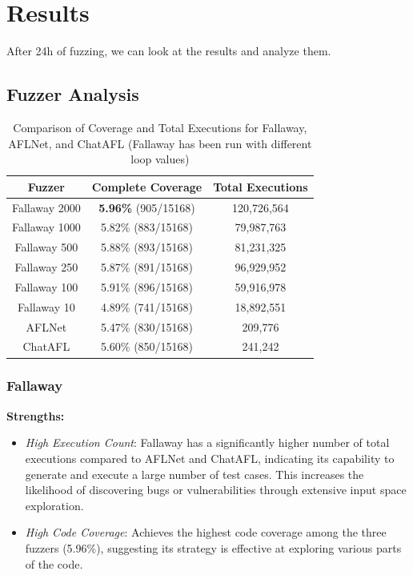 \chapter{Results}
\label{chap:Results}
After 24h of fuzzing, we can look at the results and analyze them.
\section{Fuzzer Analysis}

\begin{table}[H]
    \centering
    \begin{tabular}{|c|c|c|}
    \hline
    \textbf{Fuzzer} & \textbf{Complete Coverage} & \textbf{Total Executions} \\
    \hline
    Fallaway 2000 & \textbf{5.96\%} (905/15168) & 120,726,564 \\
    \hline
    Fallaway 1000 & 5.82\% (883/15168) & 79,987,763 \\
    \hline
    Fallaway 500 & 5.88\% (893/15168) & 81,231,325 \\
    \hline
    Fallaway 250 & 5.87\% (891/15168) & 96,929,952 \\
    \hline
    Fallaway 100 & 5.91\% (896/15168) & 59,916,978 \\
    \hline
    Fallaway 10 & 4.89\% (741/15168) & 18,892,551 \\
    \hline
    AFLNet & 5.47\% (830/15168) & 209,776 \\
    \hline
    ChatAFL & 5.60\% (850/15168) & 241,242 \\
    \hline
    \end{tabular}
    
    \caption{Comparison of Coverage and Total Executions for Fallaway, AFLNet, and ChatAFL (Fallaway has been run with different loop values)}
    \label{tab:fuzzer_comparison}
\end{table}

\subsection{Fallaway}

\textbf{Strengths:}
\begin{itemize}
    \item \textit{High Execution Count}: Fallaway has a significantly higher number of total executions compared to AFLNet and ChatAFL, indicating its capability to generate and execute a large number of test cases. This increases the likelihood of discovering bugs or vulnerabilities through extensive input space exploration.
    \item \textit{High Code Coverage}: Achieves the highest code coverage among the three fuzzers (5.96\%), suggesting its strategy is effective at exploring various parts of the code.
\end{itemize}

